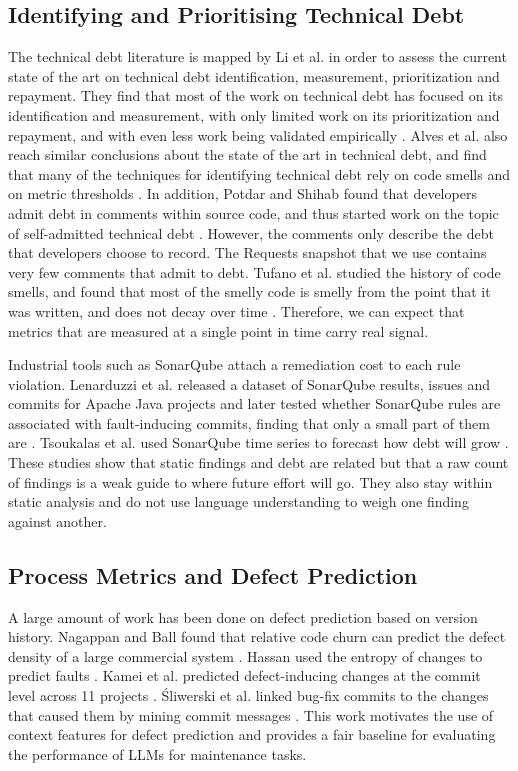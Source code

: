 \documentclass[12pt,onecolumn,draftclsnofoot]{IEEEtran}
\begin{document}
\subsection{Identifying and Prioritising Technical Debt}

The technical debt literature is mapped by Li et al. in order to assess the current state of the art on technical debt identification, measurement, prioritization and repayment. They find that most of the work on technical debt has focused on its identification and measurement, with only limited work on its prioritization and repayment, and with even less work being validated empirically \cite{li2015}. Alves et al. also reach similar conclusions about the state of the art in technical debt, and find that many of the techniques for identifying technical debt rely on code smells and on metric thresholds \cite{alves2016}. In addition, Potdar and Shihab found that developers admit debt in comments within source code, and thus started work on the topic of self-admitted technical debt \cite{potdar2014}. However, the comments only describe the debt that developers choose to record. The Requests snapshot that we use contains very few comments that admit to debt. Tufano et al. studied the history of code smells, and found that most of the smelly code is smelly from the point that it was written, and does not decay over time \cite{tufano2015}. Therefore, we can expect that metrics that are measured at a single point in time carry real signal.

Industrial tools such as SonarQube attach a remediation cost to each rule violation. Lenarduzzi et al. released a dataset of SonarQube results, issues and commits for Apache Java projects \cite{lenarduzzi2019tdd} and later tested whether SonarQube rules are associated with fault-inducing commits, finding that only a small part of them are \cite{lenarduzzi2020sonar}. Tsoukalas et al. used SonarQube time series to forecast how debt will grow \cite{tsoukalas2020}. These studies show that static findings and debt are related but that a raw count of findings is a weak guide to where future effort will go. They also stay within static analysis and do not use language understanding to weigh one finding against another.

\subsection{Process Metrics and Defect Prediction}

A large amount of work has been done on defect prediction based on version history. Nagappan and Ball found that relative code churn can predict the defect density of a large commercial system \cite{nagappan2005}. Hassan used the entropy of changes to predict faults \cite{hassan2009}. Kamei et al. predicted defect-inducing changes at the commit level across 11 projects \cite{kamei2013}. \'{S}liwerski et al. linked bug-fix commits to the changes that caused them by mining commit messages \cite{sliwerski2005}. This work motivates the use of context features for defect prediction and provides a fair baseline for evaluating the performance of LLMs for maintenance tasks.
\end{document}
